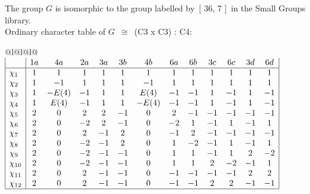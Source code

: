 \documentclass[varwidth=\maxdimen,border=10]{standalone}
\begin{document}
The group $G$ is isomorphic to the group labelled by\ [ 36, 7 ]\ in the Small Groups library.\\
Ordinary character table of $G$\ $\cong$\ (C3 x C3) : C4:\\
\begin{center}
\begin{tabular}{@{}l@{}l@{}l@{}}
\hline
\(\begin{array}{|l|cccccccccccc|}
  & 1a & 4a & 2a & 3a & 3b & 4b & 6a & 6b & 3c & 6c & 3d & 6d\\ \hline
\chi_{1} & 1 & 1 & 1 & 1 & 1 & 1 & 1 & 1 & 1 & 1 & 1 & 1\\
\chi_{2} & 1 & -1 & 1 & 1 & 1 & -1 & 1 & 1 & 1 & 1 & 1 & 1\\
\chi_{3} & 1 & -E(4) & -1 & 1 & 1 & E(4) & -1 & -1 & 1 & -1 & 1 & -1\\
\chi_{4} & 1 & E(4) & -1 & 1 & 1 & -E(4) & -1 & -1 & 1 & -1 & 1 & -1\\
\chi_{5} & 2 & 0 & 2 & 2 & -1 & 0 & 2 & -1 & -1 & -1 & -1 & -1\\
\chi_{6} & 2 & 0 & -2 & 2 & -1 & 0 & -2 & 1 & -1 & 1 & -1 & 1\\
\chi_{7} & 2 & 0 & 2 & -1 & 2 & 0 & -1 & 2 & -1 & -1 & -1 & -1\\
\chi_{8} & 2 & 0 & -2 & -1 & 2 & 0 & 1 & -2 & -1 & 1 & -1 & 1\\
\chi_{9} & 2 & 0 & -2 & -1 & -1 & 0 & 1 & 1 & -1 & 1 & 2 & -2\\
\chi_{10} & 2 & 0 & -2 & -1 & -1 & 0 & 1 & 1 & 2 & -2 & -1 & 1\\
\chi_{11} & 2 & 0 & 2 & -1 & -1 & 0 & -1 & -1 & -1 & -1 & 2 & 2\\
\chi_{12} & 2 & 0 & 2 & -1 & -1 & 0 & -1 & -1 & 2 & 2 & -1 & -1\\
\hline
\end{array}\)\\
\end{tabular}
\end{center}
\end{document}
